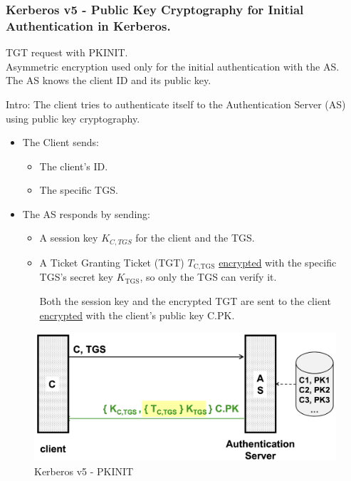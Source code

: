\clearpage
\subsubsection*{Kerberos v5 - Public Key Cryptography for Initial Authentication in Kerberos.}
\begin{center}
    TGT request with PKINIT.
    \\ Asymmetric encryption used only for the initial  authentication with the AS.
    \\The AS knows the client ID and its public key.
\end{center}
Intro: The client tries to authenticate itself to the Authentication Server (AS) using public key cryptography.
\begin{itemize}
    \item The Client sends:
    \begin{itemize}
        \item The client's ID.
        \item The specific TGS.
    \end{itemize}
    \item The AS responds by sending:
    \begin{itemize}
        \item A session key $K_{C,TGS}$ for the client and the TGS.
        \item A Ticket Granting Ticket (TGT)  $T_{\text{C,TGS}}$ \underline{encrypted} with the specific TGS's secret key $K_{\text{TGS}}$, so only the TGS can verify it.
        \begin{center}
            Both the session key and the encrypted TGT are sent to the client \underline{encrypted} with the client's public key $\text{C.PK}$.
        \end{center}
        
    \end{itemize}
\end{itemize}
\begin{figure}[H]
    \centering
    \includegraphics[width=0.5\linewidth]{Images/Authentication/kerv5.png}
    \caption{Kerberos v5 - PKINIT}
\end{figure}

